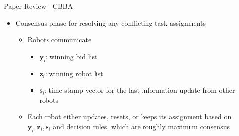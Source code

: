 \begin{frame}{Paper Review - CBBA}
    \begin{itemize}
        \item Consensus phase for resolving any conflicting task assignments
        \begin{itemize}
            \item Robots communicate
            \begin{itemize}
                \item $\mathbf{y}_i$: winning bid list
                \item $\mathbf{z}_i$: winning robot list
                \item $\mathbf{s}_i$:  time stamp vector for the last information update from other robots
            \end{itemize}
            \pause
            \item Each robot either updates, resets, or keeps its assignment based on $\mathbf{y}_i, \mathbf{z}_i, \mathbf{s}_i$ and decision rules, which are roughly maximum consensus 
        \end{itemize}
    \end{itemize}

\end{frame}

